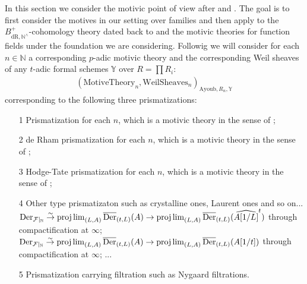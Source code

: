 \documentclass[12pt]{article}
\theoremstyle{definition}
\begin{document}
\noindent In this section we consider the motivic point of view after \cite{2G} and \cite{2A}. The goal is to first consider the motives in our setting over families and then apply to the $B^+_{\mathrm{dR},\mathbb{N}^\wedge}$-cohomology theory dated back to \cite{2F} and the motivic theories for function fields under the foundation we are considering. Followig \cite{2A} we will consider for each $n\in \mathbb{N}$ a corresponding $p$-adic motivic theory and the corresponding Weil sheaves of any $t$-adic formal schemes $\mathbb{Y}$ over $R = \prod R_i$:
\begin{align}
(\mathrm{MotiveTheory}_{n}, \mathrm{WeilSheaves}_n)_{\mathrm{Ayoub}, R_n,\mathbb{Y}}
\end{align}
corresponding to the following three prismatizations:
\begin{itemize}
\item[1] Prismatization for each $n$, which is a motivic theory in the sense of \cite{2A};
\item[2] de Rham prismatization for each $n$, which is a motivic theory in the sense of \cite{2A};
\item[3] Hodge-Tate prismatization for each $n$, which is a motivic theory in the sense of \cite{2A};
\item[4] Other type prismatizaton such as crystalline ones, Laurent ones and so on...
\subitem[4A]  $\mathrm{Der}_{\mathcal{F}|_{\mathbb{N}}}\overset{\sim}{\rightarrow} \projlim_{(L,A)}\overline{\mathrm{Der}}_{(t,L)}(A) \overset{}{\rightarrow} \projlim_{(L,A)}\overline{\mathrm{Der}}_{(t,L)}(\widehat{A[1/L]}^t)$ through compactification at $\infty$; 
\subitem[4B]  $\mathrm{Der}_{\mathcal{F}|_{\mathbb{N}}}\overset{\sim}{\rightarrow} \projlim_{(L,A)}\overline{\mathrm{Der}}_{(t,L)}(A) \overset{}{\rightarrow} \projlim_{(L,A)}\overline{\mathrm{Der}}_{(t,L)}({A[1/t]})$ through compactification at $\infty$;
\subitem[4C] ...
\item[5] Prismatization carrying filtration such as Nygaard filtrations.
\end{itemize}
\end{document}
